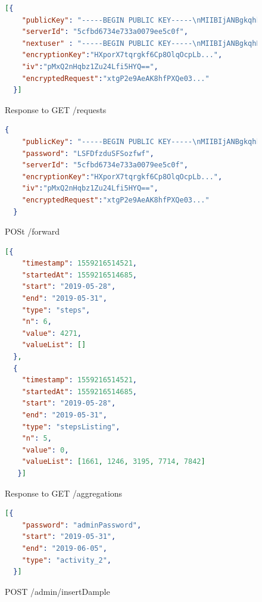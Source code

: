 \begin{figure}[h!]
  \begin{lstlisting}[language=json,firstnumber=1]
  [{
    "publicKey": "-----BEGIN PUBLIC KEY-----\nMIIBIjANBgkqhkiG...",
    "serverId": "5cfbd6734e733a0079ee5c0f",
    "nextuser" : "-----BEGIN PUBLIC KEY-----\nMIIBIjANBgkqhBms...",
    "encryptionKey":"HXporX7tqrgkf6Cp8OlqOcpLb...",
    "iv":"pMxQ2nHqbz1Zu24Lfi5HYQ==",
    "encryptedRequest":"xtgP2e9AeAK8hfPXQe03..."
  }]
  \end{lstlisting}
  \caption{Response to GET /requests}
  \label{get-requests-response}
\end{figure}

\begin{figure}[h!]
  \begin{lstlisting}[language=json,firstnumber=1]
  {
    "publicKey": "-----BEGIN PUBLIC KEY-----\nMIIBIjANBgkqhkiG...",
    "password": "LSFDfzduSFSozfwf",
    "serverId": "5cfbd6734e733a0079ee5c0f",
    "encryptionKey":"HXporX7tqrgkf6Cp8OlqOcpLb...",
    "iv":"pMxQ2nHqbz1Zu24Lfi5HYQ==",
    "encryptedRequest":"xtgP2e9AeAK8hfPXQe03..."
  }
  \end{lstlisting}
  \caption{POSt /forward}
  \label{post-request}
\end{figure}

\begin{figure}[h!]
  \begin{lstlisting}[language=json,firstnumber=1]
  [{
    "timestamp": 1559216514521,
    "startedAt": 1559216514685,
    "start": "2019-05-28",
    "end": "2019-05-31",
    "type": "steps",
    "n": 6,
    "value": 4271,
    "valueList": []
  },
  {
    "timestamp": 1559216514521,
    "startedAt": 1559216514685,
    "start": "2019-05-28",
    "end": "2019-05-31",
    "type": "stepsListing",
    "n": 5,
    "value": 0,
    "valueList": [1661, 1246, 3195, 7714, 7842]
   }]
  \end{lstlisting}
  \caption{Response to GET /aggregations}
  \label{get-aggregations}
\end{figure}

\begin{figure}[h!]
  \begin{lstlisting}[language=json,firstnumber=1]
  [{
    "password": "adminPassword",
    "start": "2019-05-31",
    "end": "2019-06-05",
    "type": "activity_2",
  }]
  \end{lstlisting}
  \caption{POST /admin/insertDample}
  \label{insert-sample}
\end{figure}

